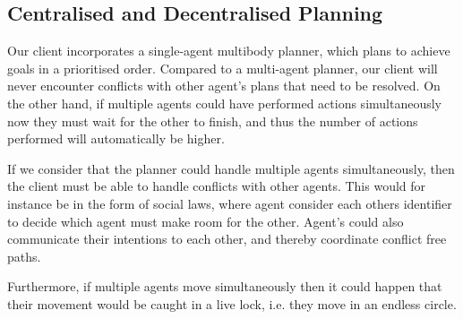 \subsection{Centralised and Decentralised Planning}

Our client incorporates a single-agent multibody planner, which plans to achieve goals in a prioritised order.
Compared to a multi-agent planner, our client will never encounter conflicts with other agent's plans that need to be resolved.
On the other hand, if multiple agents could have performed actions simultaneously now they must wait for the other to finish, and thus the number of actions performed will automatically be higher.

If we consider that the planner could handle multiple agents simultaneously, then the client must be able to handle conflicts with other agents.
This would for instance be in the form of social laws, where agent consider each others identifier to decide which agent must make room for the other.
Agent's could also communicate their intentions to each other, and thereby coordinate conflict free paths.

Furthermore, if multiple agents move simultaneously then it could happen that their movement would be caught in a live lock, i.e. they move in an endless circle.
